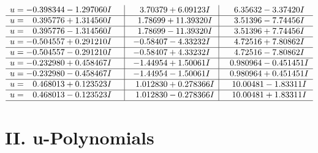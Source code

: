 \documentclass[1p]{elsarticle_modified}
\theoremstyle{definition}
\begin{document}
$$\begin{array}{c|c|c}
\begin{aligned}
u &= -0.398344 - 1.297060 I\end{aligned}
 & \phantom{-}3.70379 + 6.09123 I & \phantom{-}6.35632 - 3.37420 I \\ \hline\begin{aligned}
u &= \phantom{-}0.395776 + 1.314560 I\end{aligned}
 & \phantom{-}1.78699 + 11.39320 I & \phantom{-}3.51396 - 7.74456 I \\ \hline\begin{aligned}
u &= \phantom{-}0.395776 - 1.314560 I\end{aligned}
 & \phantom{-}1.78699 - 11.39320 I & \phantom{-}3.51396 + 7.74456 I \\ \hline\begin{aligned}
u &= -0.504557 + 0.291210 I\end{aligned}
 & -0.58407 - 4.33232 I & \phantom{-}4.72516 + 7.80862 I \\ \hline\begin{aligned}
u &= -0.504557 - 0.291210 I\end{aligned}
 & -0.58407 + 4.33232 I & \phantom{-}4.72516 - 7.80862 I \\ \hline\begin{aligned}
u &= -0.232980 + 0.458467 I\end{aligned}
 & -1.44954 + 1.50061 I & \phantom{-}0.980964 - 0.451451 I \\ \hline\begin{aligned}
u &= -0.232980 - 0.458467 I\end{aligned}
 & -1.44954 - 1.50061 I & \phantom{-}0.980964 + 0.451451 I \\ \hline\begin{aligned}
u &= \phantom{-}0.468013 + 0.123523 I\end{aligned}
 & \phantom{-}1.012830 + 0.278366 I & \phantom{-}10.00481 - 1.83311 I \\ \hline\begin{aligned}
u &= \phantom{-}0.468013 - 0.123523 I\end{aligned}
 & \phantom{-}1.012830 - 0.278366 I & \phantom{-}10.00481 + 1.83311 I\\
 \hline 
 \end{array}$$\newpage
\newpage\renewcommand{\arraystretch}{1}
\centering \section*{ II. u-Polynomials}
\end{document}
